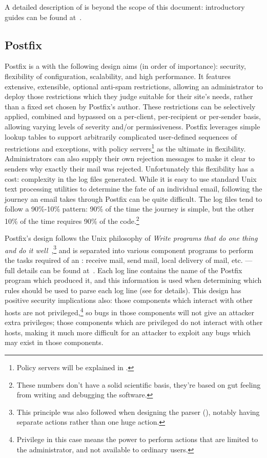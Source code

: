 A detailed description of \SMTP{} is beyond the scope of this document:
introductory guides can be found at~\cite{smtp-intro-01, smtp-intro-02}.

\subsection{Postfix}

\label{postfix background}

Postfix is a \MTA{} with the following design aims (in order of
importance): security, flexibility of configuration, scalability, and high
performance.  It features extensive, extensible, optional anti-spam
restrictions, allowing an administrator to deploy those restrictions which
they judge suitable for their site's needs, rather than a fixed set chosen
by Postfix's author.  These restrictions can be selectively applied,
combined and bypassed on a per-client, per-recipient or per-sender basis,
allowing varying levels of severity and/or permissiveness.  Postfix
leverages simple lookup tables to support arbitrarily complicated
user-defined sequences of restrictions and exceptions, with policy
servers\footnote{Policy servers will be explained in .} as the ultimate in flexibility.  Administrators can also supply
their own rejection messages to make it clear to senders why exactly their
mail was rejected.  Unfortunately this flexibility has a cost: complexity
in the log files generated.  While it is easy to use standard Unix text
processing utilities to determine the fate of an individual email,
following the journey an email takes through Postfix can be quite
difficult.  The log files tend to follow a 90\%-10\% pattern: 90\% of the
time the journey is simple, but the other 10\% of the time requires 90\% of
the code.\footnote{These numbers don't have a solid scientific basis,
they're based on gut feeling from writing and debugging the software.}

Postfix's design follows the Unix philosophy of \textit{Write programs that
do one thing and do it well\/}~\cite{unix-philosophy},\footnote{This
principle was also followed when designing the parser (), notably having separate actions rather than one huge action.} and
is separated into various component programs to perform the tasks required
of an \MTA{}\@: receive mail, send mail, local delivery of mail, etc. ---
full details can be found at~\cite{postfix-overview}.  Each log line
contains the name of the Postfix program which produced it, and this
information is used when determining which rules should be used to parse
each log line (see  for details).  This
design has positive security implications also: those components which
interact with other hosts are not privileged,\footnote{Privilege in this
case means the power to perform actions that are limited to the
administrator, and not available to ordinary users.} so bugs in those
components will not give an attacker extra privileges; those components
which are privileged do not interact with other hosts, making it much more
difficult for an attacker to exploit any bugs which may exist in those
components.

